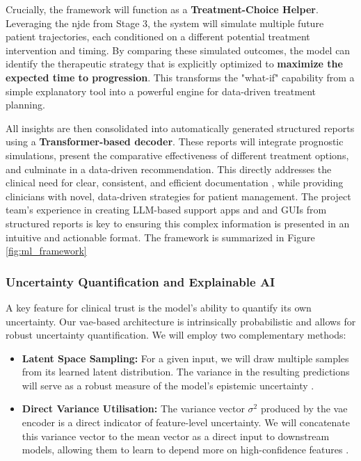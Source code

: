 \documentclass[11pt, a4paper]{article}
\begin{document}
Crucially, the framework will function as a \textbf{Treatment-Choice Helper}. Leveraging the \gls{njde} from Stage 3, the system will simulate multiple future patient trajectories, each conditioned on a different potential treatment intervention and timing. By comparing these simulated outcomes, the model can identify the therapeutic strategy that is explicitly optimized to \textbf{maximize the expected time to progression}. This transforms the "what-if" capability from a simple explanatory tool into a powerful engine for data-driven treatment planning.

All insights are then consolidated into automatically generated structured reports using a \textbf{Transformer-based decoder}. These reports will integrate prognostic simulations, present the comparative effectiveness of different treatment options, and culminate in a data-driven recommendation. This directly addresses the clinical need for clear, consistent, and efficient documentation \cite{JorgHalfmann2023, SacoranskyKwan2024}, while providing clinicians with novel, data-driven strategies for patient management. The project team's experience in creating LLM-based support apps and and GUIs from structured reports is key to ensuring this complex information is presented in an intuitive and actionable format. The framework is summarized in Figure \ref{fig:ml_framework}



\subsubsection{Uncertainty Quantification and Explainable AI}
A key feature for clinical trust is the model's ability to quantify its own uncertainty. Our \gls{vae}-based architecture is intrinsically probabilistic and allows for robust uncertainty quantification. We will employ two complementary methods:
\begin{itemize}
    \item \textbf{Latent Space Sampling:} For a given input, we will draw multiple samples from its learned latent distribution. The variance in the resulting predictions will serve as a robust measure of the model's epistemic uncertainty \cite{BustinMeyer2025}.
    \item \textbf{Direct Variance Utilisation:} The variance vector $\sigma^2$ produced by the \gls{vae} encoder is a direct indicator of feature-level uncertainty. We will concatenate this variance vector to the mean vector as a direct input to downstream models, allowing them to learn to depend more on high-confidence features \cite{FriedrichFrisch2024}.
\end{itemize}
\end{document}
